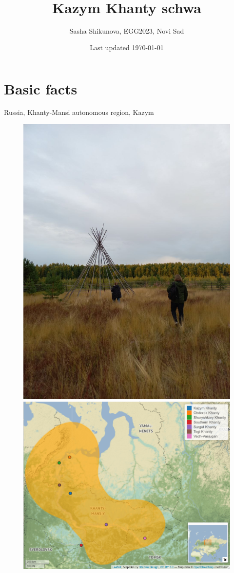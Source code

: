 \documentclass[a4paper, 12pt]{article}
\title{Kazym Khanty schwa}
\author{Sasha Shikunova, EGG2023, Novi Sad}
\date{Last updated \today}
\begin{document}
\maketitle

	\section{Basic facts}
	
	Russia, Khanty-Mansi autonomous region, Kazym
	
	\begin{figure}[H]
		\centering
		\includegraphics[scale=.167]{beginning}
		\hfill
		\includegraphics[scale=.4]{map}
	\end{figure}
\end{document}
